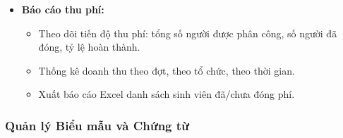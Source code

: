 \begin{itemize}
    \item \textbf{Báo cáo thu phí:}
    \begin{itemize}
        \item Theo dõi tiến độ thu phí: tổng số người được phân công, số người đã đóng, tỷ lệ hoàn thành.
        \item Thống kê doanh thu theo đợt, theo tổ chức, theo thời gian.
        \item Xuất báo cáo Excel danh sách sinh viên đã/chưa đóng phí.
    \end{itemize}
\end{itemize}

\subsubsection{Quản lý Biểu mẫu và Chứng từ}

